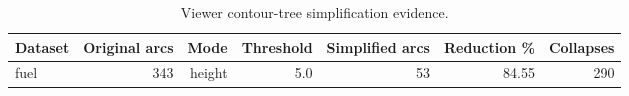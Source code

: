 \begin{table}[htbp]
\centering
\small
\caption{Viewer contour-tree simplification evidence.}
\label{tab:simplification-extension}
\begin{tabular}{lrrrrrr}
\hline
Dataset & Original arcs & Mode & Threshold & Simplified arcs & Reduction \% & Collapses \\
\hline
fuel & 343 & height & 5.0 & 53 & 84.55 & 290 \\
\hline
\end{tabular}
\end{table}
